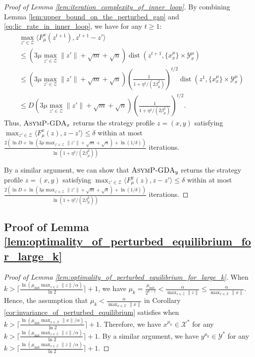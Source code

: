 \documentclass{article}
\DeclareMathOperator{\dist}{dist}
\newcommand{\X}{\mathcal{X}}
\newcommand{\Y}{\mathcal{Y}}
\newcommand{\Z}{\mathcal{Z}}
\theoremstyle{plain}
\begin{document}
\begin{proof}[Proof of Lemma \ref{lem:iteration_complexity_of_inner_loop}]
    By combining Lemma \ref{lem:upper_bound_on_the_perturbed_gap} and \eqref{eq:lic_rate_in_inner_loop}, we have for any $t\geq 1$:
    \begin{align*}
        & \max_{z'\in \Z}\langle F_{\mu}^x(z^{t+1}), z^{t+1} - z'\rangle                                                                                                                       \\
        & \leq \left(3\mu\max_{z'\in \Z}\|z'\| + \sqrt{m} + \sqrt{n}\right) \dist\!\left(z^{t+1}, \{x_x^{\mu}\}\times \Y_x^{\mu}\right)                                                        \\
        & \leq \left(3\mu\max_{z'\in \Z}\|z'\| + \sqrt{m} + \sqrt{n}\right) \left(\frac{1}{1 + \eta^2 / (2\beta_{\mu}^2)}\right)^{t/2} \dist\!\left(z^1, \{x_x^{\mu}\}\times \Y_x^{\mu}\right) \\
        & \leq D\left(3\mu\max_{z'\in \Z}\|z'\| + \sqrt{m} + \sqrt{n}\right) \left(\frac{1}{1 + \eta^2 / (2\beta_{\mu}^2)}\right)^{t/2}.
    \end{align*}
    Thus, $\textsc{AsymP-GDA}_x$ returns the strategy profile $z = (x, y)$ satisfying $\max_{z'\in \Z}\langle F_{\mu}^x(z), z - z'\rangle \leq \delta$ within at most $\frac{ 2\left(\ln D + \ln \left(3\mu\max_{z'\in \Z}\|z'\| + \sqrt{m} + \sqrt{n}\right) + \ln (1 / \delta)\right)}{\ln \left(1 + \eta^2 / (2\beta_{\mu}^2)\right)}$ iterations.

    By a similar argument, we can show that $\textsc{AsymP-GDA}_y$ returns the strategy profile $z = (x, y)$ satisfying $\max_{z'\in \Z}\langle F_{\mu}^y(z), z - z'\rangle \leq \delta$ within at most $\frac{ 2\left(\ln D + \ln \left(3\mu\max_{z'\in \Z}\|z'\| + \sqrt{m} + \sqrt{n}\right) + \ln (1 / \delta)\right)}{\ln \left(1 + \eta^2 / (2\beta_{\mu}^2)\right)}$ iterations.
\end{proof}


\subsection{Proof of Lemma \ref{lem:optimality_of_perturbed_equilibrium_for_large_k}}
\begin{proof}[Proof of Lemma \ref{lem:optimality_of_perturbed_equilibrium_for_large_k}]
    When $k > \lceil \frac{\ln (\mu_{\mathrm{init}}\max_{z\in \Z}\|z\|/\alpha)}{\ln 2}\rceil + 1$, we have $\mu_k = \frac{\mu_{\mathrm{init}}}{2^{k-1}} < \frac{\alpha}{\max_{z\in \Z}\|z\|} \leq \frac{\alpha}{\max_{x\in \X}\|x\|}$.
    Hence, the assumption that $\mu_k < \frac{\alpha}{\max_{x\in \X}\|x\|}$ in Corollary \ref{cor:invariance_of_perturbed_equilibrium} satisfies when $k > \lceil \frac{\ln (\mu_{\mathrm{init}}\max_{x\in \X}\|x\|/\alpha)}{\ln 2}\rceil + 1$.
    Therefore, we have $x^{\mu_k} \in \X^{\ast}$ for any $k > \lceil \frac{\ln (\mu_{\mathrm{init}}\max_{z\in \Z}\|z\|/\alpha)}{\ln 2}\rceil + 1$.
    By a similar argument, we have $y^{\mu_k} \in \Y^{\ast}$ for any $k > \lceil \frac{\ln (\mu_{\mathrm{init}}\max_{z\in \Z}\|z\|/\alpha)}{\ln 2}\rceil + 1$.
\end{proof}
\end{document}
